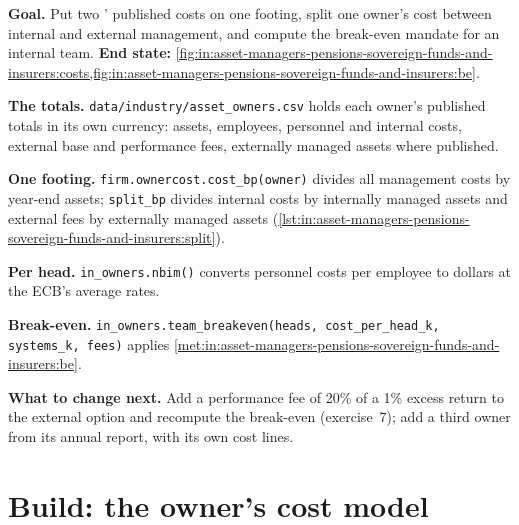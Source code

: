 \begin{tutorial}
\textbf{Goal.} Put two ' published costs on one footing, split one owner's cost between internal and external
management, and compute the break-even mandate for an internal team. \textbf{End state:}
\cref{fig:in:asset-managers-pensions-sovereign-funds-and-insurers:costs,fig:in:asset-managers-pensions-sovereign-funds-and-insurers:be}.
\begin{tutsteps}
\item \textbf{The totals.} \texttt{data/industry/asset\_owners.csv} holds each owner's published totals in its own
currency: assets, employees, personnel and internal costs, external base and performance fees, externally managed
assets where published.
\item \textbf{One footing.} \texttt{firm.ownercost.cost\_bp(owner)} divides all management costs by year-end assets;
\texttt{split\_bp} divides internal costs by internally managed assets and external fees by externally managed assets
(\cref{lst:in:asset-managers-pensions-sovereign-funds-and-insurers:split}).
\label{lst:in:asset-managers-pensions-sovereign-funds-and-insurers:split}
\item \textbf{Per head.} \texttt{in\_owners.nbim()} converts personnel costs per employee to dollars at the ECB's average
rates.
\item \textbf{Break-even.} \texttt{in\_owners.team\_breakeven(heads, cost\_per\_head\_k, systems\_k, fees)} applies
\cref{met:in:asset-managers-pensions-sovereign-funds-and-insurers:be}.
\end{tutsteps}
\end{tutorial}

\textbf{What to change next.} Add a performance fee of 20\% of a 1\% excess return to the external option and recompute
the break-even (exercise~7); add a third owner from its annual report, with its own cost lines.

\section{Build: the owner's cost model}\label{bld:in:asset-managers-pensions-sovereign-funds-and-insurers:ownercost}

